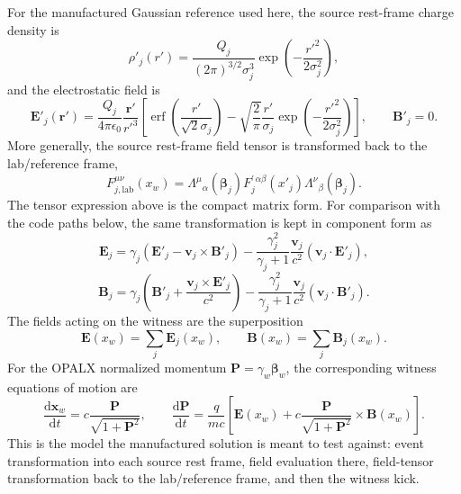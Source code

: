 \documentclass[11pt]{article}
\newcommand{\vect}[1]{\boldsymbol{#1}}
\newcommand{\dd}{\mathrm{d}}
\newcommand{\E}{\vect{E}}
\newcommand{\B}{\vect{B}}
\newcommand{\Pmom}{\vect{P}}
\newcommand{\betav}{\boldsymbol{\beta}}
\numberwithin{equation}{section}
\begin{document}
For the manufactured Gaussian reference used here, the source rest-frame
charge density is
\begin{equation}
  \rho'_j(r') =
  \frac{Q_j}{(2\pi)^{3/2}\sigma_j^3}
  \exp\left(-\frac{r'^2}{2\sigma_j^2}\right),
\end{equation}
and the electrostatic field is
\begin{equation}
  \E'_j(\vect r') =
  \frac{Q_j}{4\pi\epsilon_0}
  \frac{\vect r'}{r'^3}
  \left[
    \operatorname{erf}\left(\frac{r'}{\sqrt{2}\sigma_j}\right)
    -
    \sqrt{\frac{2}{\pi}}\frac{r'}{\sigma_j}
    \exp\left(-\frac{r'^2}{2\sigma_j^2}\right)
  \right],
  \qquad
  \B'_j=0.
\end{equation}
More generally, the source rest-frame field tensor is transformed back to the
lab/reference frame,
\begin{equation}
  F^{\mu\nu}_{j,\mathrm{lab}}(x_w)
  =
  \Lambda^\mu{}_{\alpha}(\betav_j)
  F_j^{\prime\,\alpha\beta}(x'_j)
  \Lambda^\nu{}_{\beta}(\betav_j).
\end{equation}
The tensor expression above is the compact matrix form.  For comparison with
the code paths below, the same transformation is kept in component form as
\begin{equation}
  \E_j =
  \gamma_j(\E'_j-\vect v_j\times\B'_j)
  -
  \frac{\gamma_j^2}{\gamma_j+1}
  \frac{\vect v_j}{c^2}
  (\vect v_j\cdot\E'_j),
\end{equation}
\begin{equation}
  \B_j =
  \gamma_j\left(\B'_j+\frac{\vect v_j\times\E'_j}{c^2}\right)
  -
  \frac{\gamma_j^2}{\gamma_j+1}
  \frac{\vect v_j}{c^2}
  (\vect v_j\cdot\B'_j).
\end{equation}
The fields acting on the witness are the superposition
\begin{equation}
  \E(x_w)=\sum_j \E_j(x_w),
  \qquad
  \B(x_w)=\sum_j \B_j(x_w).
\end{equation}
For the OPALX normalized momentum
\(\Pmom=\gamma_w\betav_w\), the corresponding witness equations of motion are
\begin{equation}
  \frac{\dd \vect x_w}{\dd t}
  =
  c\frac{\Pmom}{\sqrt{1+\Pmom^2}},
  \qquad
  \frac{\dd \Pmom}{\dd t}
  =
  \frac{q}{m c}
  \left[
    \E(x_w)
    +
    c\frac{\Pmom}{\sqrt{1+\Pmom^2}}\times\B(x_w)
  \right].
\end{equation}
This is the model the manufactured solution is meant to test against: event
transformation into each source rest frame, field evaluation there, field-tensor
transformation back to the lab/reference frame, and then the witness kick.
\end{document}
